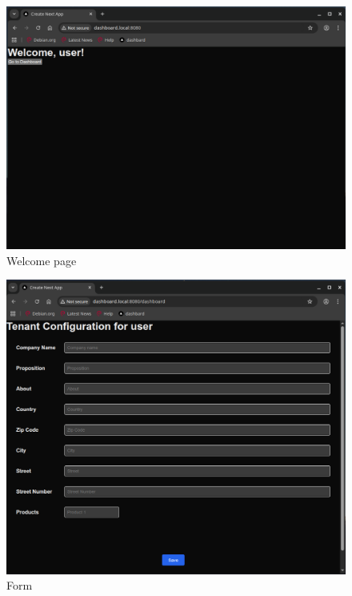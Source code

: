 \documentclass[11pt, a4paper, oneside, listof=totoc]{scrartcl}
\begin{document}
                \begin{figure}[h!]
                    \centering
                    \includegraphics[width=\textwidth]{screenshots/eval/dashboardfe/dashboardfe-welcome-page.png}
                    \caption{Welcome page}\label{fig:dashboardfe-welcome-page}
                \end{figure}

                \begin{figure}[h!]
                    \centering
                    \includegraphics[width=\textwidth]{screenshots/eval/dashboardfe/dashboardfe-form.png}
                    \caption{Form}\label{fig:dashboardfe-form}
                \end{figure}
\end{document}
